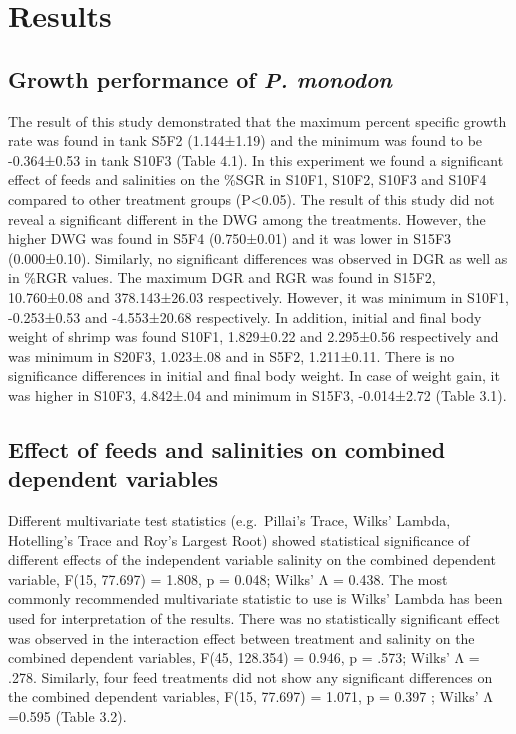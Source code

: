 \documentclass[
]{book}
\begin{document}
\hypertarget{results}{%
\chapter{Results}\label{results}}

\hypertarget{growth-performance-of-p.-monodon}{%
\section{\texorpdfstring{Growth performance of \emph{P. monodon}}{Growth performance of P. monodon}}\label{growth-performance-of-p.-monodon}}

The result of this study demonstrated that the maximum percent specific
growth rate was found in tank S5F2 (1.144±1.19) and the minimum was
found to be -0.364±0.53 in tank S10F3 (Table 4.1). In this experiment we
found a significant effect of feeds and salinities on the \%SGR in S10F1,
S10F2, S10F3 and S10F4 compared to other treatment groups (P\textless0.05). The
result of this study did not reveal a significant different in the DWG
among the treatments. However, the higher DWG was found in S5F4
(0.750±0.01) and it was lower in S15F3 (0.000±0.10). Similarly, no
significant differences was observed in DGR as well as in \%RGR values.
The maximum DGR and RGR was found in S15F2, 10.760±0.08 and
378.143±26.03 respectively. However, it was minimum in S10F1,
-0.253±0.53 and -4.553±20.68 respectively. In addition, initial and
final body weight of shrimp was found S10F1, 1.829±0.22 and 2.295±0.56
respectively and was minimum in S20F3, 1.023±.08 and in S5F2,
1.211±0.11. There is no significance differences in initial and final
body weight. In case of weight gain, it was higher in S10F3, 4.842±.04
and minimum in S15F3, -0.014±2.72 (Table 3.1).

\hypertarget{effect-of-feeds-and-salinities-on-combined-dependent-variables}{%
\section{Effect of feeds and salinities on combined dependent variables}\label{effect-of-feeds-and-salinities-on-combined-dependent-variables}}

Different multivariate test statistics (e.g.~Pillai's Trace, Wilks'
Lambda, Hotelling's Trace and Roy's Largest Root) showed statistical
significance of different effects of the independent variable salinity
on the combined dependent variable, F(15, 77.697) = 1.808, p = 0.048;
Wilks' Λ = 0.438. The most commonly recommended multivariate statistic
to use is Wilks' Lambda has been used for interpretation of the results.
There was no statistically significant effect was observed in the
interaction effect between treatment and salinity on the combined
dependent variables, F(45, 128.354) = 0.946, p = .573; Wilks' Λ = .278.
Similarly, four feed treatments did not show any significant differences
on the combined dependent variables, F(15, 77.697) = 1.071, p = 0.397 ;
Wilks' Λ =0.595 (Table 3.2).
\end{document}
